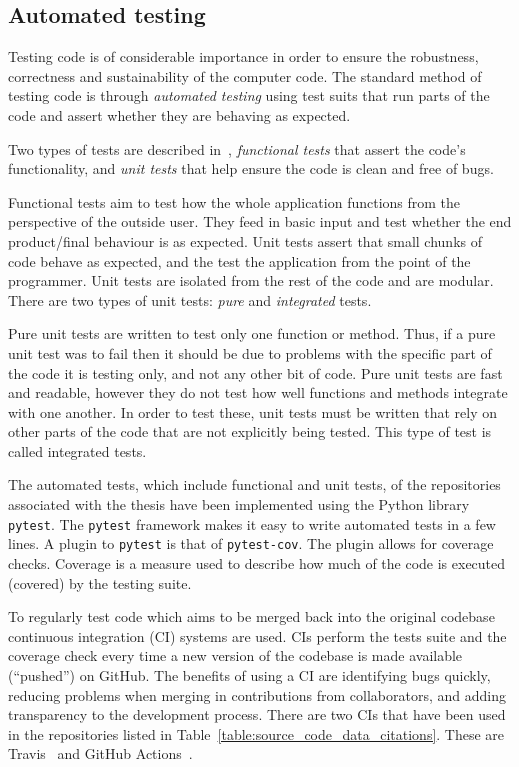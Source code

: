 \subsection{Automated testing}

Testing code is of considerable importance in order to ensure the robustness,
correctness and sustainability of the computer code. The standard method of testing code is through
\textit{automated testing} using test suits that run parts of the code and
assert whether they are behaving as expected.

Two types of tests are described in~\cite{Percival2014}, \textit{functional
tests} that assert the code's functionality, and \textit{unit tests} that help
ensure the code is clean and free of bugs.

Functional tests aim to test how the whole application functions from the
perspective of the outside user. They feed in basic input and test whether the
end product/final behaviour is as expected. Unit tests assert that small chunks
of code behave as expected, and the test the application from the point of the
programmer. Unit tests are isolated from the rest of the code and are modular.
There are two types of unit tests: \textit{pure} and \textit{integrated} tests.

Pure unit tests are written to test only one function or method. Thus, if a pure
unit test was to fail then it should be due to problems with the specific part
of the code it is testing only, and not any other bit of code. Pure unit tests
are fast and readable, however they do not test how well functions and methods
integrate with one another. In order to test these, unit tests must be written
that rely on other parts of the code that are not explicitly being tested. This
type of test is called integrated tests.

The automated tests, which include functional and unit tests, of the
repositories associated with the thesis have been implemented using the Python
library \texttt{pytest}. The \texttt{pytest} framework
makes it easy to write automated tests in a few lines. A plugin to
\texttt{pytest} is that of \texttt{pytest-cov}. The plugin
allows for coverage checks. Coverage is a measure used to describe how much of
the code is executed (covered) by the testing suite.

To regularly test code which aims to be merged back into the original codebase
continuous integration (CI) systems are used. CIs perform the tests suite and
the coverage check every time a new version of the codebase is made available
(``pushed'') on GitHub. The benefits of using a CI are identifying bugs quickly,
reducing problems when merging in contributions from collaborators, and adding
transparency to the development process. There are two CIs that have been used
in the repositories listed in Table~\ref{table:source_code_data_citations}.
These are Travis~\cite{travis} and GitHub Actions~\cite{github_actions}.

